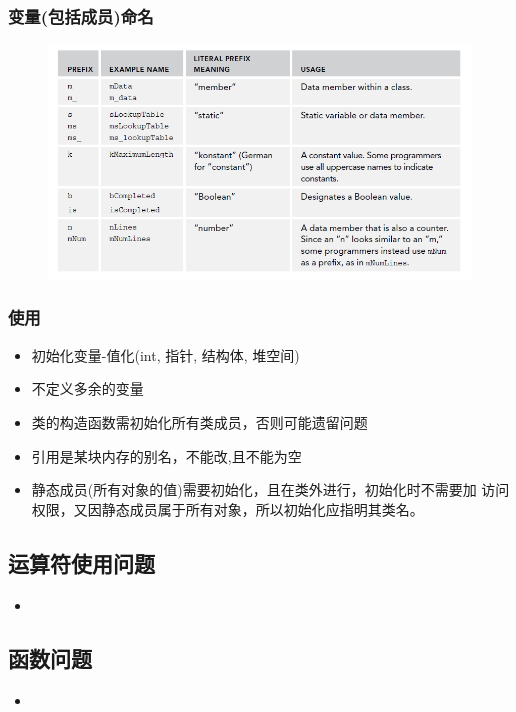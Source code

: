 \documentclass[UTF8,a4paper,12pt]{ctexbook} %
\begin{document}
			\subsubsection{变量(包括成员)命名}
				\begin{figure}[H]
					\centering
					\includegraphics[scale = 0.6]{Naming.png}
				\end{figure}

			\subsubsection{使用}
			\begin{itemize}
				\item 初始化变量-值化(int, 指针, 结构体,  堆空间)
				\item 不定义多余的变量  
				\item 类的构造函数需初始化所有类成员，否则可能遗留问题
				\item 引用是某块内存的别名，不能改,且不能为空
				\item 静态成员(所有对象的值)需要初始化，且在类外进行，初始化时不需要加 访问权限，又因静态成员属于所有对象，所以初始化应指明其类名。
			\end{itemize}
		\subsection{运算符使用问题}
			\begin{itemize}
				\item 
			\end{itemize}
		\subsection{函数问题}
			\begin{itemize}
				\item 
			\end{itemize}
\end{document}

